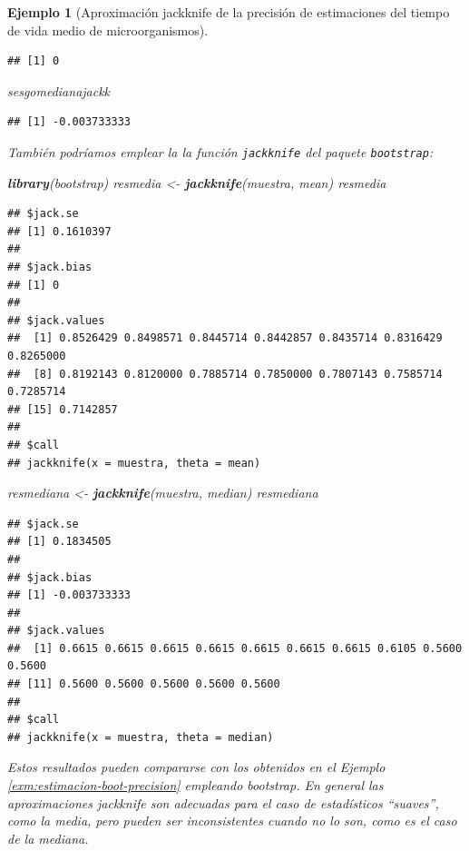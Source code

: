 \documentclass[
]{book}
\newenvironment{Shaded}{\begin{snugshade}}{\end{snugshade}}
\newcommand{\FunctionTok}[1]{\textcolor[rgb]{0.13,0.29,0.53}{\textbf{#1}}}
\newcommand{\NormalTok}[1]{#1}
\newcommand{\OtherTok}[1]{\textcolor[rgb]{0.56,0.35,0.01}{#1}}
\theoremstyle{break}
\newtheorem{example}{Ejemplo}[chapter]
\theoremstyle{nonumberplain}
\begin{document}
\begin{example}[Aproximación jackknife de la precisión de estimaciones del tiempo de vida medio de microorganismos]
\begin{verbatim}
## [1] 0
\end{verbatim}

\begin{Shaded}
\begin{Highlighting}[]
\NormalTok{sesgomedianajackk}
\end{Highlighting}
\end{Shaded}

\begin{verbatim}
## [1] -0.003733333
\end{verbatim}

También podríamos emplear la la función \texttt{jackknife} del paquete \texttt{bootstrap}:

\begin{Shaded}
\begin{Highlighting}[]
\FunctionTok{library}\NormalTok{(bootstrap)}
\NormalTok{resmedia }\OtherTok{\textless{}{-}} \FunctionTok{jackknife}\NormalTok{(muestra, mean)}
\NormalTok{resmedia}
\end{Highlighting}
\end{Shaded}

\begin{verbatim}
## $jack.se
## [1] 0.1610397
## 
## $jack.bias
## [1] 0
## 
## $jack.values
##  [1] 0.8526429 0.8498571 0.8445714 0.8442857 0.8435714 0.8316429 0.8265000
##  [8] 0.8192143 0.8120000 0.7885714 0.7850000 0.7807143 0.7585714 0.7285714
## [15] 0.7142857
## 
## $call
## jackknife(x = muestra, theta = mean)
\end{verbatim}

\begin{Shaded}
\begin{Highlighting}[]
\NormalTok{resmediana }\OtherTok{\textless{}{-}} \FunctionTok{jackknife}\NormalTok{(muestra, median)}
\NormalTok{resmediana}
\end{Highlighting}
\end{Shaded}

\begin{verbatim}
## $jack.se
## [1] 0.1834505
## 
## $jack.bias
## [1] -0.003733333
## 
## $jack.values
##  [1] 0.6615 0.6615 0.6615 0.6615 0.6615 0.6615 0.6615 0.6105 0.5600 0.5600
## [11] 0.5600 0.5600 0.5600 0.5600 0.5600
## 
## $call
## jackknife(x = muestra, theta = median)
\end{verbatim}

Estos resultados pueden compararse con los obtenidos en el Ejemplo \ref{exm:estimacion-boot-precision} empleando bootstrap.
En general las aproximaciones jackknife son adecuadas para el caso de estadísticos
``suaves'', como la media, pero pueden ser inconsistentes cuando no lo son,
como es el caso de la mediana.
\end{example}
\end{document}
